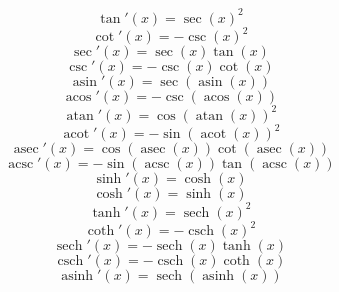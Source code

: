 \documentclass{article}
\DeclareMathOperator{\asin}{asin}
\DeclareMathOperator{\acos}{acos}
\DeclareMathOperator{\atan}{atan}
\DeclareMathOperator{\acot}{acot}
\DeclareMathOperator{\asec}{asec}
\DeclareMathOperator{\acsc}{acsc}
\DeclareMathOperator{\sech}{sech}
\DeclareMathOperator{\csch}{csch}
\DeclareMathOperator{\asinh}{asinh}
\begin{document}
    \begin{equation}
        \tan'(x)=\sec(x)^2
    \end{equation}
    \begin{equation}
        \cot'(x)=-\csc(x)^2
    \end{equation}
    \begin{equation}
        \sec'(x)=\sec(x)\tan(x)
    \end{equation}
    \begin{equation}
        \csc'(x)=-\csc(x)\cot(x)
    \end{equation}
    \begin{equation}
        \asin'(x)=\sec(\asin(x))
    \end{equation}
    \begin{equation}
        \acos'(x)=-\csc(\acos(x))
    \end{equation}
    \begin{equation}
        \atan'(x)=\cos(\atan(x))^2
    \end{equation}
    \begin{equation}
        \acot'(x)=-\sin(\acot(x))^2
    \end{equation}
    \begin{equation}
        \asec'(x)=\cos(\asec(x))\cot(\asec(x))
    \end{equation}
    \begin{equation}
        \acsc'(x)=-\sin(\acsc(x))\tan(\acsc(x))
    \end{equation}
    \begin{equation}
        \sinh'(x)=\cosh(x)
    \end{equation}
    \begin{equation}
        \cosh'(x)=\sinh(x)
    \end{equation}
    \begin{equation}
        \tanh'(x)=\sech(x)^2
    \end{equation}
    \begin{equation}
        \coth'(x)=-\csch(x)^2
    \end{equation}
    \begin{equation}
        \sech'(x)=-\sech(x)\tanh(x)
    \end{equation}
    \begin{equation}
        \csch'(x)=-\csch(x)\coth(x)
    \end{equation}
    \begin{equation}
        \asinh'(x)=\sech(\asinh(x))
    \end{equation}
\end{document}
